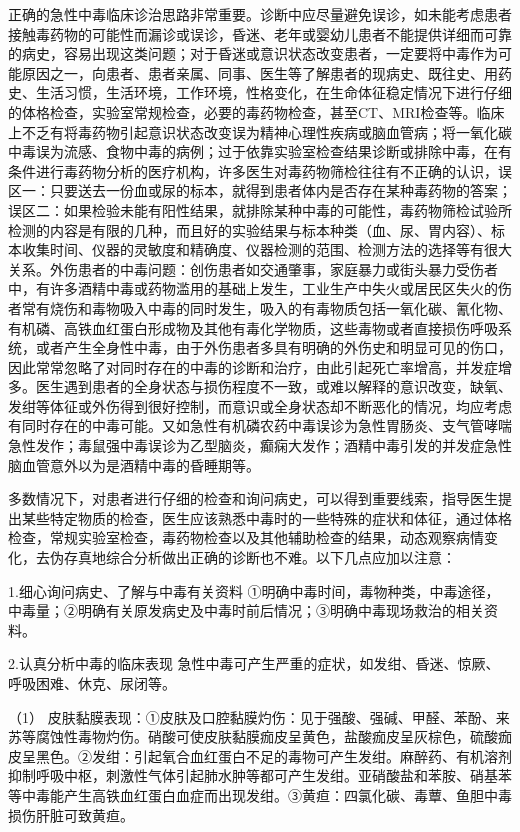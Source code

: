 正确的急性中毒临床诊治思路非常重要。诊断中应尽量避免误诊，如未能考虑患者接触毒药物的可能性而漏诊或误诊，昏迷、老年或婴幼儿患者不能提供详细而可靠的病史，容易出现这类问题；对于昏迷或意识状态改变患者，一定要将中毒作为可能原因之一，向患者、患者亲属、同事、医生等了解患者的现病史、既往史、用药史、生活习惯，生活环境，工作环境，性格变化，在生命体征稳定情况下进行仔细的体格检查，实验室常规检查，必要的毒药物检查，甚至CT、MRI检查等。临床上不乏有将毒药物引起意识状态改变误为精神心理性疾病或脑血管病；将一氧化碳中毒误为流感、食物中毒的病例；过于依靠实验室检查结果诊断或排除中毒，在有条件进行毒药物分析的医疗机构，许多医生对毒药物筛检往往有不正确的认识，误区一：只要送去一份血或尿的标本，就得到患者体内是否存在某种毒药物的答案；误区二：如果检验未能有阳性结果，就排除某种中毒的可能性，毒药物筛检试验所检测的内容是有限的几种，而且好的实验结果与标本种类（血、尿、胃内容）、标本收集时间、仪器的灵敏度和精确度、仪器检测的范围、检测方法的选择等有很大关系。外伤患者的中毒问题：创伤患者如交通肇事，家庭暴力或街头暴力受伤者中，有许多酒精中毒或药物滥用的基础上发生，工业生产中失火或居民区失火的伤者常有烧伤和毒物吸入中毒的同时发生，吸入的有毒物质包括一氧化碳、氰化物、有机磷、高铁血红蛋白形成物及其他有毒化学物质，这些毒物或者直接损伤呼吸系统，或者产生全身性中毒，由于外伤患者多具有明确的外伤史和明显可见的伤口，因此常常忽略了对同时存在的中毒的诊断和治疗，由此引起死亡率增高，并发症增多。医生遇到患者的全身状态与损伤程度不一致，或难以解释的意识改变，缺氧、发绀等体征或外伤得到很好控制，而意识或全身状态却不断恶化的情况，均应考虑有同时存在的中毒可能。又如急性有机磷农药中毒误诊为急性胃肠炎、支气管哮喘急性发作；毒鼠强中毒误诊为乙型脑炎，癫痫大发作；酒精中毒引发的并发症急性脑血管意外以为是酒精中毒的昏睡期等。

多数情况下，对患者进行仔细的检查和询问病史，可以得到重要线索，指导医生提出某些特定物质的检查，医生应该熟悉中毒时的一些特殊的症状和体征，通过体格检查，常规实验室检查，毒药物检查以及其他辅助检查的结果，动态观察病情变化，去伪存真地综合分析做出正确的诊断也不难。以下几点应加以注意：

1.细心询问病史、了解与中毒有关资料
①明确中毒时间，毒物种类，中毒途径，中毒量；②明确有关原发病史及中毒时前后情况；③明确中毒现场救治的相关资料。

2.认真分析中毒的临床表现
急性中毒可产生严重的症状，如发绀、昏迷、惊厥、呼吸困难、休克、尿闭等。

（1）
皮肤黏膜表现：①皮肤及口腔黏膜灼伤：见于强酸、强碱、甲醛、苯酚、来苏等腐蚀性毒物灼伤。硝酸可使皮肤黏膜痂皮呈黄色，盐酸痂皮呈灰棕色，硫酸痂皮呈黑色。②发绀：引起氧合血红蛋白不足的毒物可产生发绀。麻醉药、有机溶剂抑制呼吸中枢，刺激性气体引起肺水肿等都可产生发绀。亚硝酸盐和苯胺、硝基苯等中毒能产生高铁血红蛋白血症而出现发绀。③黄疸：四氯化碳、毒蕈、鱼胆中毒损伤肝脏可致黄疸。

